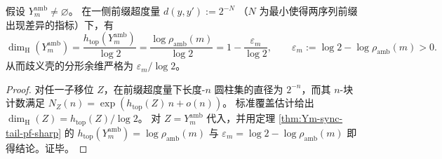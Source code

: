 \begin{corollary}[熵缺口标定的分形余维：\texorpdfstring{$\mathrm{codim}=\varepsilon_m/\log 2$}{codim=eps/log2}]\label{cor:Ym-amb-codim-from-entropy-gap}
假设 \(Y_m^{\mathrm{amb}}\neq\varnothing\)。
在一侧前缀超度量
\(
d(y,y'):=2^{-N}
\)
（\(N\) 为最小使得两序列前缀出现差异的指标）下，有
\[
\dim_{\mathrm H}(Y_m^{\mathrm{amb}})
=\frac{h_{\mathrm{top}}(Y_m^{\mathrm{amb}})}{\log 2}
=\frac{\log\rho_{\mathrm{amb}}(m)}{\log 2}
=1-\frac{\varepsilon_m}{\log 2},
\qquad
\varepsilon_m:=\log 2-\log\rho_{\mathrm{amb}}(m)>0.
\]
从而歧义壳的分形余维严格为 \(\varepsilon_m/\log 2\)。
\end{corollary}
\begin{proof}
对任一子移位 \(Z\)，在前缀超度量下长度-\(n\) 圆柱集的直径为 \(2^{-n}\)，而其 \(n\)-块计数满足
\(
N_Z(n)=\exp(h_{\mathrm{top}}(Z)\,n+o(n))
\)。
标准覆盖估计给出 \(\dim_{\mathrm H}(Z)=h_{\mathrm{top}}(Z)/\log 2\)。
对 \(Z=Y_m^{\mathrm{amb}}\) 代入，并用定理 \ref{thm:Ym-sync-tail-pf-sharp} 的
\(
h_{\mathrm{top}}(Y_m^{\mathrm{amb}})=\log\rho_{\mathrm{amb}}(m)
\)
与 \(\varepsilon_m=\log 2-\log\rho_{\mathrm{amb}}(m)\) 即得结论。证毕。
\end{proof}
